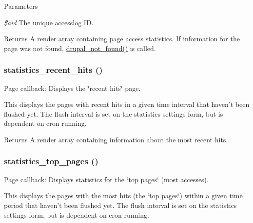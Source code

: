 \begin{DoxyParams}{Parameters}
\item[{\em \$aid}]The unique accesslog ID.\end{DoxyParams}
\begin{DoxyReturn}{Returns}
A render array containing page access statistics. If information for the page was not found, \hyperlink{group__http__handling_ga52b08cd98e1756326c1bd5b56c39a884}{drupal\_\-not\_\-found()} is called. 
\end{DoxyReturn}
\hypertarget{statistics_8admin_8inc_a27cb7cc9ddce90da1b0a6c8c5e469dc9}{
\subsubsection[{statistics\_\-recent\_\-hits}]{\setlength{\rightskip}{0pt plus 5cm}statistics\_\-recent\_\-hits ()}}
\label{statistics_8admin_8inc_a27cb7cc9ddce90da1b0a6c8c5e469dc9}
Page callback: Displays the \char`\"{}recent hits\char`\"{} page.

This displays the pages with recent hits in a given time interval that haven't been flushed yet. The flush interval is set on the statistics settings form, but is dependent on cron running.

\begin{DoxyReturn}{Returns}
A render array containing information about the most recent hits. 
\end{DoxyReturn}
\hypertarget{statistics_8admin_8inc_a9bae73cb7e5a689cbe7e43aefd9205fc}{
\subsubsection[{statistics\_\-top\_\-pages}]{\setlength{\rightskip}{0pt plus 5cm}statistics\_\-top\_\-pages ()}}
\label{statistics_8admin_8inc_a9bae73cb7e5a689cbe7e43aefd9205fc}
Page callback: Displays statistics for the \char`\"{}top pages\char`\"{} (most accesses).

This displays the pages with the most hits (the \char`\"{}top pages\char`\"{}) within a given time period that haven't been flushed yet. The flush interval is set on the statistics settings form, but is dependent on cron running.

